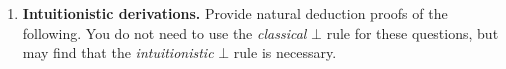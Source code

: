 \documentclass[11pt]{report}
\newcommand{\temp}[2]{{\overline{#2}}^{#1}}
\begin{document}
\begin{enumerate}
\begin{enumerate}
		\newpage
		\item $\lnot(A \lor  B) \ \vdash \lnot A\land \lnot B$
		
		\textbf{Solution:}

		\begin{center}
			$\begin{array}{c}
				\infer[\land I]{\lnot A \land \lnot B}
					{\infer[\to I, 1]{\lnot A}
						{\infer[\MP]{\bot}
							{\infer[\lor I_{L}]{A \lor B}
								{\temp{1}{A}}
							&
							\lnot (A \lor B)}}
					&
					\infer[\to I, 2]{\lnot B}
						{\infer[\MP]{\bot}
							{\infer[\lor I_{R}]{A \lor B}
								{\temp{2}{B}}
							&
							\lnot (A \lor B)}}}
			\end{array}$
		\end{center}

		\item $A \to \lnot B \ \vdash \ \lnot (A \land B)$
		
		\textbf{Solution:}

		\begin{center}
			$\begin{array}{c}
				\infer[\to I, 1]{\lnot(A \land B)}
					{\infer[\MP]{\bot}
						{\infer[\MP]{\lnot B}
							{\infer[\land E_{L}]{A}
								{\temp{1}{A \land B}}
							&
							A \to \lnot B}
						&
						\infer[\land E_{R}]{B}
							{\temp{1}{A \land B}}}}
			\end{array}$
		\end{center}

		\item $\vdash \ \lnot\lnot (A \lor \lnot A)$
		
		\textbf{Solution:}

		\begin{center}
			$\begin{array}{c}
				\infer[\to I, 1]{\lnot \lnot(A \lor \lnot A)}
					{\infer[\MP]{\bot}
						{\infer[\lor I_{R}]{A \lor \lnot A}
							{\infer[\to I, 2]{\lnot A}
								{\infer[\MP]{\bot}
									{\infer[\lor I_{L}]{A \lor \lnot A}
										{\temp{2}{A}}
									&
									\temp{1}{\lnot(A \lor \lnot A)}}}}
						&
						\temp{1}{\lnot(A \lor \lnot A)}}}
			\end{array}$
		\end{center}

		\newpage
	\end{enumerate}

	\item \textbf{Intuitionistic derivations.} Provide natural deduction proofs of the following. You do not need to use the \emph{classical} $\bot$ rule for these questions, but may find that the \emph{intuitionistic} $\bot$ rule is necessary.
	 

\end{enumerate}
\end{document}
